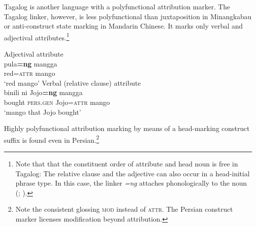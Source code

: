 Tagalog is another language with a polyfunctional attribution marker. The Tagalog linker, however, is less polyfunctional than juxtaposition in Minangkabau or anti-construct state marking in Mandarin Chinese. It marks only verbal and adjectival attributes.\footnote{Note that that the constituent order of attribute and head noun is free in Tagalog: The relative clause and the adjective can also occur in a head-initial phrase type. In this case, the linker \textit{=ng} attaches phonologically to the noun (\citealt[1]{gil2005}; \citealt[160, 162]{himmelmann1997}).}
\begin{exe}
\ex 
{} \label{multi tagalog}
\begin{xlist}
\ex \textrm{Adjectival attribute}\\
\gll	pula\textbf{=ng} mangga\\
	red{=\textsc{attr}} mango\\
\glt	‘red mango’
\ex \textrm{Verbal (relative clause) attribute}\\
\gll	binili ni Jojo\textbf{=ng} mangga\\
	bought \textsc{pers.gen} Jojo{=\textsc{attr}} mango\\
\glt	‘mango that Jojo bought’
\end{xlist}
\end{exe}
Highly polyfunctional attribution marking by means of a head-marking construct suffix is found even in Persian.\footnote{Note the consistent glossing \textsc{mod} instead of \textsc{attr}. The Persian construct marker licenses modification beyond attribution.}
